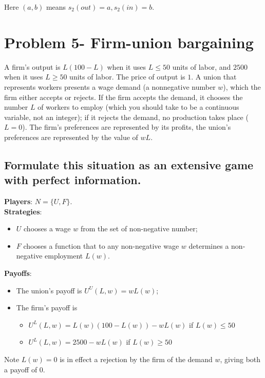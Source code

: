 \documentclass{article}
\begin{document}
Here $(a,b)$ means $s_2(out)=a, s_2(in)=b$.


\section{Problem 5- Firm-union bargaining}

A firm's output is $L(100-L)$ when it uses $L \leq 50$ units of labor, and $2500$ when it uses
$L \geq 50$ units of labor. The price of output is $1$. A union that represents workers
presents a wage demand (a nonnegative number $w$), which the firm either accepts or rejects. If
the firm accepts the demand, it chooses the number $L$ of workers to employ (which you should
take to be a continuous variable, not an integer); if it rejects the demand, no production
takes place ($L = 0$). The firm's preferences are represented by its profits, the union's
preferences are represented by  the value of $wL$.

\subsection{Formulate this situation as an extensive game with perfect information. }

\textbf{Players}: $N = \{U, F \}$. \\ 
\textbf{Strategies}: 
\begin{itemize}
\item $U$ chooses a wage $w$ from the set of non-negative number; 
\item $F$ chooses a function that to any non-negative wage $w$ determines a non-negative employment $L(w)$.
\end{itemize}

\textbf{Payoffs}: 

\begin{itemize}
\item The union's payoff is $U^U(L,w)=wL(w)$; 
\item The firm's payoff is 
\begin{itemize}
\item $U^L(L,w)=L(w)(100-L(w)) - wL(w)$ if $L(w) \le 50$
\item $U^L(L,w)=2500 - wL(w)$ if $L(w) \ge 50$
\end{itemize}

\end{itemize}

Note $L(w) = 0$ is in effect a rejection by the firm of the demand $w$, giving both a payoff of $0$.
%
\end{document}

